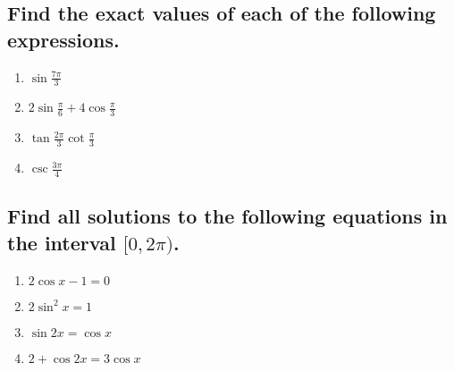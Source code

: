 \documentclass[12pt]{book}
\theoremstyle{definition}
\begin{document}
\subsection*{Find the exact values of each of the following expressions.}
\begin{enumerate}[resume]
    \item $\sin\frac{7\pi}{3}$\\[4pt]
    \item $2\sin\frac{\pi}{6}+4\cos\frac{\pi}{3}$\\[4pt]
    \item $\tan\frac{2\pi}{3}\cot\frac{\pi}{3}$\\[4pt]
    \item $\csc\frac{3\pi}{4}$\\[4pt]
\end{enumerate}
\subsection*{Find all solutions to the following equations in the interval $[0,2\pi)$.}
\begin{enumerate}[resume]
    \item $2\cos x-1=0$\\[8pt]
    \item $2\sin^2x=1$\\[8pt]
    \item $\sin 2x=\cos x$\\[8pt]
    \item $2+\cos 2x=3\cos x$
\end{enumerate}
\end{document}
